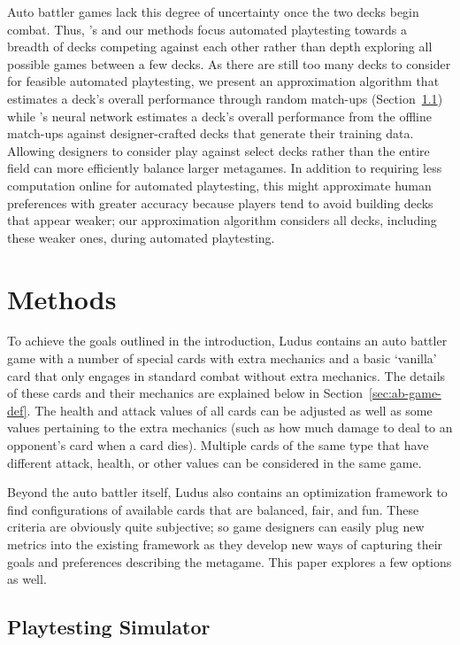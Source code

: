 \documentclass[letterpaper]{article} %
\begin{document}
Auto battler games lack this degree of uncertainty once the two decks begin combat.
Thus, \citeauthor{tencent_autobattle_lineup}'s 
and our methods focus automated playtesting towards a breadth of decks competing
against each other rather than depth exploring all possible games between a few
decks.  As there are still too many decks to consider for feasible automated
playtesting, we present an approximation algorithm that estimates a deck's overall
performance through random match-ups (Section~\ref{sec:sim}) while
\citeauthor{tencent_autobattle_lineup}'s neural network estimates a deck's overall
performance from the offline match-ups against designer-crafted decks that generate
their training data.  Allowing designers to consider play against select decks
rather than the entire field can more efficiently balance larger metagames.
In addition to requiring less computation online for automated playtesting, this
might approximate human preferences with greater accuracy because players
tend to avoid building decks that appear weaker; our approximation algorithm
considers all decks, including these weaker ones, during automated playtesting.
\fi

\section{Methods} \label{sec:methods}
To achieve the goals outlined in the introduction, {\sc Ludus} contains an auto battler game with a number of special cards with extra mechanics and a basic `vanilla' card that only engages in standard combat without extra mechanics. The details of these cards and their mechanics are explained below in Section~\ref{sec:ab-game-def}. The health and attack values of all cards can be adjusted as well as some values pertaining to the extra mechanics (such as how much damage to deal to an opponent's card when a card dies). Multiple cards of the same type that have different attack, health, or other values can be considered in the same game. 

Beyond the auto battler itself, {\sc Ludus} also contains an optimization framework to find configurations of available cards that are balanced, fair, and fun. These criteria are obviously quite subjective; so game designers can easily plug new metrics into the existing framework as they develop new ways of capturing their goals and preferences describing the metagame. This paper explores a few options as well.

\subsection{Playtesting Simulator} \label{sec:sim}
\end{document}
